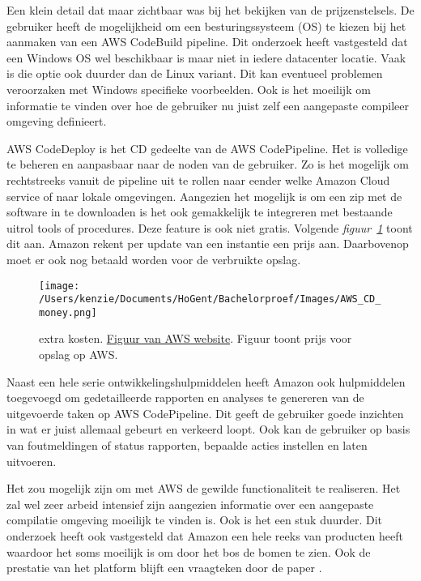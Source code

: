 Een klein detail dat maar zichtbaar was bij het bekijken van de prijzenstelsels. De gebruiker heeft de mogelijkheid om een besturingssysteem (OS) te kiezen bij het aanmaken van een AWS CodeBuild pipeline. Dit onderzoek heeft vastgesteld dat een Windows OS wel beschikbaar is maar niet in iedere datacenter locatie. Vaak is die optie ook duurder dan de Linux variant. Dit kan eventueel problemen veroorzaken met Windows specifieke voorbeelden. Ook is het moeilijk om informatie te vinden over hoe de gebruiker nu juist zelf een aangepaste compileer omgeving definieert. 

AWS CodeDeploy is het CD gedeelte van de AWS CodePipeline. Het is volledige te beheren en aanpasbaar naar de noden van de gebruiker. Zo is het mogelijk om rechtstreeks vanuit de pipeline uit te rollen naar eender welke Amazon Cloud service of naar lokale omgevingen. Aangezien het mogelijk is om een zip met de software in te downloaden is het ook gemakkelijk te integreren met bestaande uitrol tools of procedures. Deze feature is ook niet gratis. Volgende \emph{figuur~\ref{fig:AWS_CD_money}} toont dit aan. Amazon rekent per update van een instantie een prijs aan. Daarbovenop moet er ook nog betaald worden voor de verbruikte opslag.

\begin{figure}[!htbp]
    \centering
    \texttt{[image: /Users/kenzie/Documents/HoGent/Bachelorproef/Images/AWS\_CD\_money.png]}
    \caption{extra kosten. \href{}{Figuur van AWS website}. Figuur toont prijs voor opslag op AWS.}
    \label{fig:AWS_CD_money}
\end{figure}

Naast een hele serie ontwikkelingshulpmiddelen heeft Amazon ook hulpmiddelen toegevoegd om gedetailleerde rapporten en analyses te genereren van de uitgevoerde taken op AWS CodePipeline. Dit geeft  de gebruiker goede inzichten in wat er juist allemaal gebeurt en verkeerd loopt. Ook kan de gebruiker op basis van foutmeldingen of status rapporten, bepaalde acties instellen en laten uitvoeren.

Het zou mogelijk zijn om met AWS de gewilde functionaliteit te realiseren. Het zal wel zeer arbeid intensief zijn aangezien informatie over een aangepaste compilatie omgeving moeilijk te vinden is. Ook is het een stuk duurder. Dit onderzoek heeft ook vastgesteld dat Amazon een hele reeks van producten heeft waardoor het soms moeilijk is om door het bos de bomen te zien. Ook de prestatie van het platform blijft een vraagteken door de paper \autocite{Jackson2010}.

